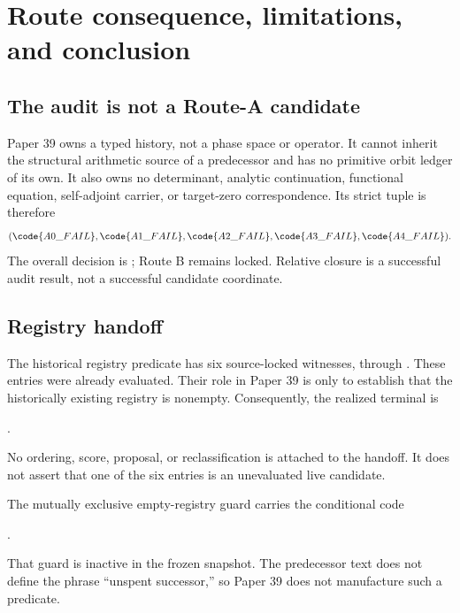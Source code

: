 \section{Route consequence, limitations, and conclusion}
\label{sec:route}

\subsection{The audit is not a Route-A candidate}

Paper 39 owns a typed history, not a phase space or operator.  It cannot inherit
the structural arithmetic source of a predecessor and has no primitive orbit
ledger of its own.  It also owns no determinant, analytic continuation,
functional equation, self-adjoint carrier, or target-zero correspondence.
Its strict tuple is therefore
\begin{equation}
(\code{A0\_FAIL},\code{A1\_FAIL},\code{A2\_FAIL},
  \code{A3\_FAIL},\code{A4\_FAIL}).
\label{eq:route-tuple}
\end{equation}
The overall decision is ; Route B remains locked.
Relative closure is a successful audit result, not a successful candidate
coordinate.

\subsection{Registry handoff}

The historical registry predicate has six source-locked witnesses,
 through .  These entries were already evaluated.
Their role in Paper 39 is only to establish that the historically existing
registry is nonempty.  Consequently, the realized terminal is
\begin{center}
.
\end{center}
No ordering, score, proposal, or reclassification is attached to the handoff.
It does not assert that one of the six entries is an unevaluated live candidate.

The mutually exclusive empty-registry guard carries the conditional code
\begin{center}
.
\end{center}
That guard is inactive in the frozen snapshot.  The predecessor text does not
define the phrase “unspent successor,” so Paper 39 does not manufacture such a
predicate.

